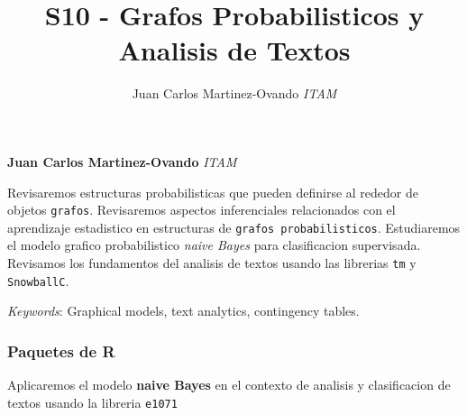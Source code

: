 \documentclass[11pt,]{article}
\title{S10 - Grafos Probabilisticos y Analisis de Textos  }
\author{\Large Juan Carlos Martinez-Ovando\vspace{0.05in} \newline\normalsize\emph{ITAM}  }
\date{}
\newcommand*{\authorfont}{\fontfamily{phv}\selectfont}
\renewenvironment{abstract}
 {{%
    \setlength{\leftmargin}{0mm}
    \setlength{\rightmargin}{\leftmargin}%
  }%
  \relax}
 {\endlist}
\begin{document}
	
%

{%
\setlength{\parindent}{0pt}
\thispagestyle{plain}
{\fontsize{18}{20}\selectfont\raggedright 
\maketitle  %

}

{
   \vskip 13.5pt\relax \normalsize\fontsize{11}{12} 
\textbf{\authorfont Juan Carlos Martinez-Ovando} \hskip 15pt \emph{\small ITAM}   

}

}








\begin{abstract}

    \hbox{\vrule height .2pt width 39.14pc}

    \vskip 8.5pt %

\noindent Revisaremos estructuras probabilisticas que pueden definirse al rededor
de objetos \texttt{grafos}. Revisaremos aspectos inferenciales
relacionados con el aprendizaje estadistico en estructuras de
\texttt{grafos\ probabilisticos}. Estudiaremos el modelo grafico
probabilistico \emph{naive Bayes} para clasificacion supervisada.
Revisamos los fundamentos del analisis de textos usando las librerias
\texttt{tm} y \texttt{SnowballC}.


\vskip 8.5pt \noindent \emph{Keywords}: Graphical models, text analytics, contingency tables. \par

    \hbox{\vrule height .2pt width 39.14pc}



\end{abstract}


\vskip 6.5pt


\noindent  \subsubsection{Paquetes de R}\label{paquetes-de-r}

Aplicaremos el modelo \textbf{naive Bayes} en el contexto de analisis y
clasificacion de textos usando la libreria \texttt{e1071}
\end{document}
